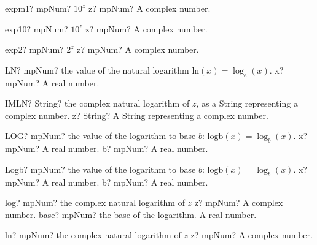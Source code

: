\documentclass[12pt,a4paper,openany]{book}
\begin{document}
\begin{mpFunctionsExtract}
\mpFunctionOne
{expm1? mpNum?  $10^z$}
{z? mpNum? A complex number.}
\end{mpFunctionsExtract}

\begin{mpFunctionsExtract}
\mpFunctionOne
{exp10? mpNum?  $10^z$}
{z? mpNum? A complex number.}
\end{mpFunctionsExtract}

\begin{mpFunctionsExtract}
\mpFunctionOne
{exp2? mpNum?  $2^z$}
{z? mpNum? A complex number.}
\end{mpFunctionsExtract}

\begin{mpFunctionsExtract}
\mpWorksheetFunctionOneNotImplemented
{LN? mpNum? the value of the natural logarithm $\text{ln}(x) = \log_e(x)$.}
{x? mpNum? A real number.}
\end{mpFunctionsExtract}

\begin{mpFunctionsExtract}
\mpWorksheetFunctionOneNotImplemented
{IMLN? String? the complex natural logarithm of $z$, as a String representing a complex number.}
{z? String? A String representing a complex number.}
\end{mpFunctionsExtract}

\begin{mpFunctionsExtract}
\mpWorksheetFunctionTwoNotImplemented
{LOG? mpNum? the value of the logarithm  to base $b$: $\text{logb}(x) = \log_{b}(x)$.}
{x? mpNum? A real number.}
{b? mpNum? A real number.}
\end{mpFunctionsExtract}

\begin{mpFunctionsExtract}
\mpFunctionTwo
{Logb? mpNum? the value of the logarithm  to base $b$: $\text{logb}(x) = \log_{b}(x)$.}
{x? mpNum? A real number.}
{b? mpNum? A real number.}
\end{mpFunctionsExtract}

\begin{mpFunctionsExtract}
\mpFunctionTwo
{log? mpNum? the complex natural logarithm of $z$}
{z? mpNum? A complex number.}
{base? mpNum? the base of the logarithm. A real number.}
\end{mpFunctionsExtract}

\begin{mpFunctionsExtract}
\mpFunctionOne
{ln? mpNum? the complex natural logarithm of $z$}
{z? mpNum? A complex number.}
\end{mpFunctionsExtract}
\end{document}
